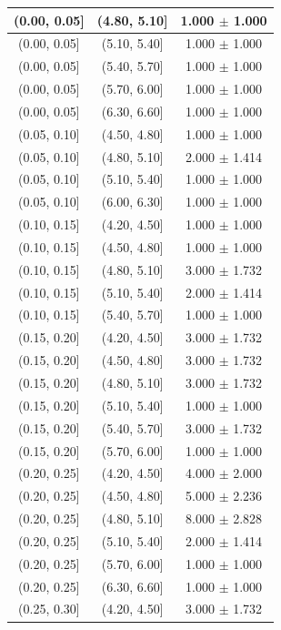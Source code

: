 \begin{longtable}{|c|c|c|}
\hline
\endlastfoot
(0.00, 0.05] & (4.80, 5.10] & 1.000 $\pm$ 1.000 \\ 
\hline
(0.00, 0.05] & (5.10, 5.40] & 1.000 $\pm$ 1.000 \\ 
\hline
(0.00, 0.05] & (5.40, 5.70] & 1.000 $\pm$ 1.000 \\ 
\hline
(0.00, 0.05] & (5.70, 6.00] & 1.000 $\pm$ 1.000 \\ 
\hline
(0.00, 0.05] & (6.30, 6.60] & 1.000 $\pm$ 1.000 \\ 
\hline
(0.05, 0.10] & (4.50, 4.80] & 1.000 $\pm$ 1.000 \\ 
\hline
(0.05, 0.10] & (4.80, 5.10] & 2.000 $\pm$ 1.414 \\ 
\hline
(0.05, 0.10] & (5.10, 5.40] & 1.000 $\pm$ 1.000 \\ 
\hline
(0.05, 0.10] & (6.00, 6.30] & 1.000 $\pm$ 1.000 \\ 
\hline
(0.10, 0.15] & (4.20, 4.50] & 1.000 $\pm$ 1.000 \\ 
\hline
(0.10, 0.15] & (4.50, 4.80] & 1.000 $\pm$ 1.000 \\ 
\hline
(0.10, 0.15] & (4.80, 5.10] & 3.000 $\pm$ 1.732 \\ 
\hline
(0.10, 0.15] & (5.10, 5.40] & 2.000 $\pm$ 1.414 \\ 
\hline
(0.10, 0.15] & (5.40, 5.70] & 1.000 $\pm$ 1.000 \\ 
\hline
(0.15, 0.20] & (4.20, 4.50] & 3.000 $\pm$ 1.732 \\ 
\hline
(0.15, 0.20] & (4.50, 4.80] & 3.000 $\pm$ 1.732 \\ 
\hline
(0.15, 0.20] & (4.80, 5.10] & 3.000 $\pm$ 1.732 \\ 
\hline
(0.15, 0.20] & (5.10, 5.40] & 1.000 $\pm$ 1.000 \\ 
\hline
(0.15, 0.20] & (5.40, 5.70] & 3.000 $\pm$ 1.732 \\ 
\hline
(0.15, 0.20] & (5.70, 6.00] & 1.000 $\pm$ 1.000 \\ 
\hline
(0.20, 0.25] & (4.20, 4.50] & 4.000 $\pm$ 2.000 \\ 
\hline
(0.20, 0.25] & (4.50, 4.80] & 5.000 $\pm$ 2.236 \\ 
\hline
(0.20, 0.25] & (4.80, 5.10] & 8.000 $\pm$ 2.828 \\ 
\hline
(0.20, 0.25] & (5.10, 5.40] & 2.000 $\pm$ 1.414 \\ 
\hline
(0.20, 0.25] & (5.70, 6.00] & 1.000 $\pm$ 1.000 \\ 
\hline
(0.20, 0.25] & (6.30, 6.60] & 1.000 $\pm$ 1.000 \\ 
\hline
(0.25, 0.30] & (4.20, 4.50] & 3.000 $\pm$ 1.732 \\ 

\end{longtable}
